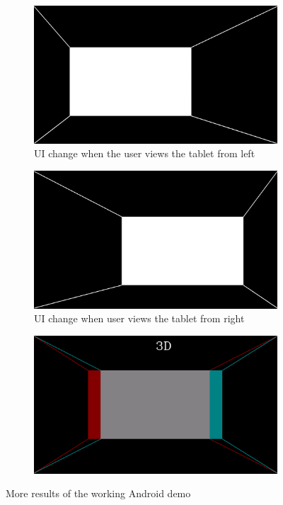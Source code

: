\documentclass[12pt,twocolumn,letterpaper]{article}
\begin{document}
\begin{figure}[!htbp]
\begin{subfigure}{0.5\textwidth}
\includegraphics[scale=0.09]{3dperspective_user_left}
\caption{UI change when the user views the tablet from left}
\end{subfigure}
\begin{subfigure}{0.5\textwidth}
\includegraphics[scale=0.09]{3dperspective_user_right}
\caption{UI change when user views the tablet from right}
\end{subfigure}
\begin{subfigure}{0.5\textwidth}
\includegraphics[scale=0.09]{anaglyph}
\end{subfigure}
\caption{More results of the working Android demo}
\label{fig:androiddemo2}
\end{figure}
\end{document}
